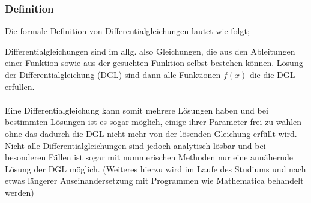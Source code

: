 \documentclass[a4paper,11pt]{article}
\theoremstyle{remark}
\newtheorem{definition}{\textbf{Definition}}[section]
\begin{document}
\subsubsection{Definition}
Die formale Definition von Differentialgleichungen lautet wie folgt;

\begin{center}
\end{center}
Differentialgleichungen sind im allg. also Gleichungen, die aus den Ableitungen einer Funktion sowie aus der gesuchten Funktion selbst bestehen können. Lösung der Differentialgleichung (DGL) sind dann alle Funktionen $f(x)$ die die DGL erfüllen. \\ \\ Eine Differentialgleichung kann somit mehrere Lösungen haben und bei bestimmten Lösungen ist es sogar möglich, einige ihrer Parameter frei zu wählen ohne das dadurch die DGL nicht mehr von der lösenden Gleichung erfüllt wird. Nicht alle Differentialgleichungen sind jedoch analytisch lösbar und bei besonderen Fällen ist sogar mit nummerischen Methoden nur eine annähernde Lösung der DGL möglich. (Weiteres hierzu wird im Laufe des Studiums und nach etwas längerer Auseinandersetzung mit Programmen wie Mathematica behandelt werden) 
\end{document}
